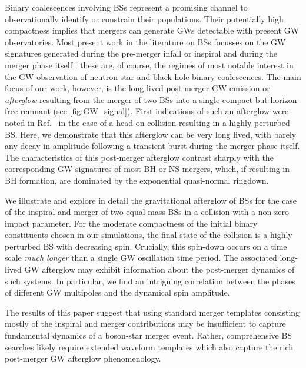 \documentclass[11pt]{report}  %
\begin{document}
Binary coalescences involving BSs
represent a promising channel to observationally
identify or constrain their populations. Their potentially high compactness implies that mergers can generate GWs detectable with present GW observatories. Most present work in the literature on BSs focusses on the GW signatures generated during the pre-merger infall or inspiral
\cite{Herdeiro:2020kba,Cardoso:2017cfl,Sennett:2017etc,Diamond:2021dth,Pacilio:2020jza} and during the
merger phase itself \cite{Amin:2020vja,Sanchis-Gual:2018oui,Sanchis-Gual:2020mzb,Sanchis_Gual_2019,Widdicombe:2019woy,
Helfer:2018vtq,Palenzuela:2017kcg,Bezares:2018qwa,Liebling:2012fv,Choptuik:2009ww,Palenzuela:2007dm,Bezares:2017mzk,
Palenzuela:2006wp,Dietrich:2018jov,Dietrich:2018bvi,Jaramillo:2022zwg,Bezares:2022obu,Macedo:2013jja}; these are, of course, the regimes of most notable
interest in the GW observation of neutron-star and black-hole
binary coalescences. The main focus of our work, however, is
the long-lived post-merger GW emission or {\it afterglow} resulting
from the merger of two BSs into a single compact but horizon-free
remnant (see \cref{fig:GW_signal}).
First indications of such an afterglow were noted in Ref.~\cite{Helfer:2018vtq} in the case of a head-on collision resulting in a highly perturbed BS. Here, we demonstrate that this afterglow can be very long lived, with barely any decay in amplitude following a transient burst during the merger phase itself. The characteristics of this post-merger afterglow contrast sharply with the corresponding GW signatures of most BH or NS mergers, which, if
resulting in BH formation, are dominated by the exponential quasi-normal ringdown. 

We illustrate and explore in detail the gravitational afterglow
of BSs for the case of the inspiral and merger 
of two equal-mass BSs in a collision with a non-zero impact parameter. For the moderate compactness of the initial binary constituents chosen in our simulations, the final state of the collision
is a highly perturbed BS with decreasing spin. Crucially, this spin-down occurs on a time scale {\it much longer} than a single GW oscillation time period.  The associated long-lived GW afterglow may exhibit information about the post-merger dynamics of such systems. In particular, we find an intriguing correlation between the phases of different GW multipoles and the dynamical spin amplitude. 

The results of this paper suggest that using standard merger templates consisting mostly of the inspiral and merger contributions may be insufficient to capture fundamental dynamics of a boson-star merger event. Rather, comprehensive BS searches likely require extended waveform templates which also capture the rich post-merger GW afterglow phenomenology.
\end{document}
